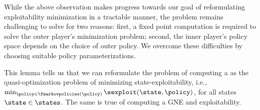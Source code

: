 While the above observation makes progress towards our goal of reformulating 
exploitability minimization in a tractable manner, the problem remains challenging to solve for two reasons: first, a fixed point computation is required to solve the outer player's minimization problem; second, the inner player's policy space depends on the choice of outer policy.
We overcome these difficulties by choosing suitable policy parameterizations.




This lemma tells us that we can reformulate the problem of computing a \MPGNE{} as the quasi-optimization problem of minimizing state-exploitability, i.e., $\min_{\policy \in \fmarkovpolicies (\policy)} \sexploit (\state, \policy)$, for all states $\state \in \states$.
The same is true of computing a GNE and exploitability.
\fi

